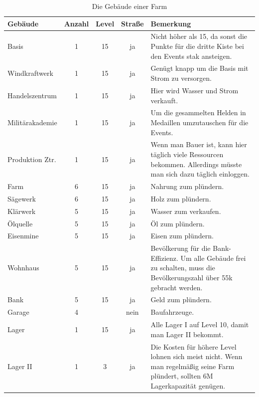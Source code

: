 \documentclass[fontsize=12pt,a4paper]{scrartcl}[2003/01/01]
\begin{document}
\begin{table}[h!]
  \centering
\begin{tabularx}{1.0\textwidth}{lcccX}
  Gebäude & Anzahl & Level & Straße & Bemerkung \\
  \hline
  Basis & 1 & 15 & ja & Nicht höher als 15, da sonst die Punkte für die dritte Kiste bei den Events stak ansteigen. \\
  Windkraftwerk & 1 & 15 & ja & Genügt knapp um die Basis mit Strom zu versorgen. \\
  Handelszentrum & 1 & 15 & ja & Hier wird Wasser und Strom verkauft. \\
  Militärakademie & 1 & 15 & ja & Um die gesammelten Helden in Medaillen umzutauschen für die Events. \\
  Produktion Ztr. & 1 & 15 & ja & Wenn man Bauer ist, kann hier täglich viele Ressourcen bekommen. 
                                  Allerdings müsste man sich dazu täglich einloggen.\\
  Farm & 6 & 15 & ja & Nahrung zum plündern. \\
  Sägewerk & 6 & 15 & ja & Holz zum plündern. \\
  Klärwerk & 5 & 15 & ja & Wasser zum verkaufen. \\
  Ölquelle & 5 & 15 & ja & Öl zum plündern. \\
  Eisenmine & 5 & 15 & ja & Eisen zum plündern. \\
  Wohnhaus & 5 & 15 & ja & Bevölkerung für die Bank-Effizienz.
                           Um alle Gebäude frei zu schalten, muss die Bevölkerungszahl über 55k gebracht werden. \\
  Bank & 5 & 15 & ja & Geld zum plündern. \\
  Garage & 4 & ~ & nein & Baufahrzeuge. \\
  Lager & 1 & 15 & ja & Alle Lager I auf Level 10, damit man Lager II bekommt. \\
  Lager II & 1 & 3 & ja & Die Kosten für höhere Level lohnen sich meist nicht. 
                          Wenn man regelmäßig seine Farm plündert, sollten 6M Lagerkapazität genügen. \\
\end{tabularx}
\caption[Gebäude]{Die Gebäude einer Farm}
\end{table}
\end{document}
